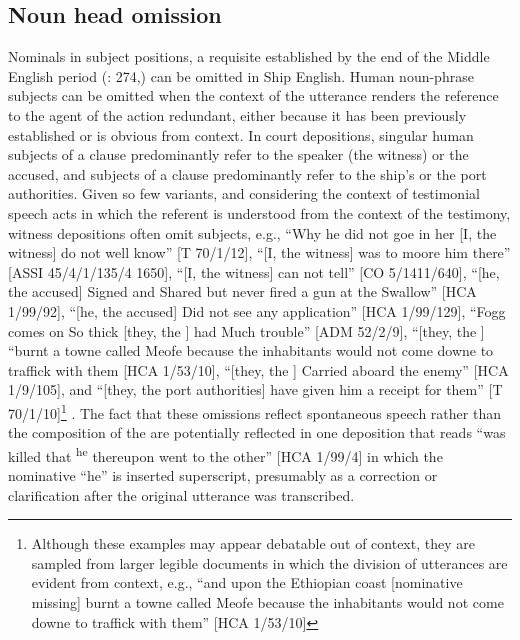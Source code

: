 \subsection{{Noun head omission} }\label{sec:5.2.4}

Nominals in subject positions, a requisite established by the end of the Middle English period (\citealt{MillwardHayes2012}: 274,) can be omitted in Ship English. Human noun-phrase subjects can be omitted when the context of the utterance renders the reference to the agent of the action redundant, either because it has been previously established or is obvious from context. In court depositions, singular human subjects of a clause predominantly refer to the speaker (the witness) or the accused, and  subjects of a clause predominantly refer to the ship’s  or the port authorities. Given so few variants, and considering the context of testimonial speech acts in which the referent is understood from the context of the testimony, witness depositions often omit  subjects, e.g., “Why he did not goe in her [I, the witness] do not well know” [T 70/1/12], “[I, the witness] was to moore him there” [ASSI 45/4/1/135/4 1650], “[I, the witness] can not tell” [CO 5/1411/640], “[he, the accused] Signed and Shared but never fired a gun at the Swallow” [HCA 1/99/92], “[he, the accused] Did not see any application” [HCA 1/99/129], “Fogg comes on So thick [they, the ] had Much trouble” [ADM 52/2/9], “[they, the ] “burnt a towne called Meofe because the inhabitants would not come downe to traffick with them [HCA 1/53/10], “[they, the ] Carried aboard the enemy” [HCA 1/9/105], and “[they, the port authorities] have given him a receipt for them” [T 70/1/10]\footnote{Although these examples may appear debatable out of context, they are sampled from larger legible documents in which the division of utterances are evident from context, e.g., “and upon the Ethiopian coast [nominative missing] burnt a towne called Meofe because the inhabitants would not come downe to traffick with them” [HCA 1/53/10]} . The fact that these omissions reflect spontaneous speech rather than the composition of the  are potentially reflected in one deposition that reads “was killed that \textsuperscript{he} thereupon went to the other” [HCA 1/99/4] in which the nominative  “he” is inserted superscript, presumably as a correction or clarification after the original utterance was transcribed. 

